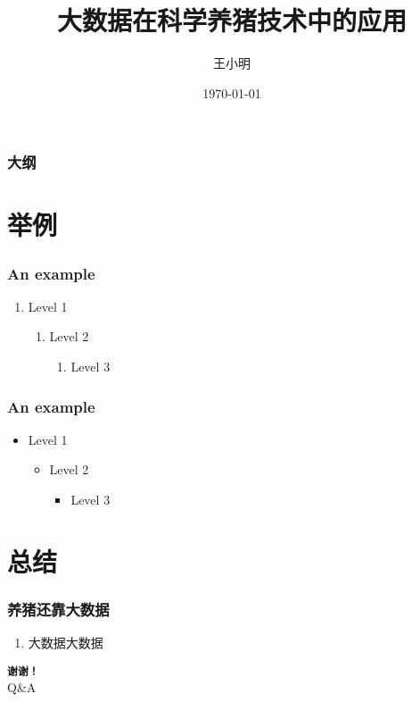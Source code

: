 \documentclass[xcolor=dvipsnames]{beamer}
\title{大数据在科学养猪技术中的应用}
\author{王小明}
\institute[CS@NJU]{南京大学计算机科学与技术系}
\date{\today}
\begin{document}
\begin{frame}
  \maketitle
\end{frame}

\begin{frame}
  \frametitle{大纲}
  \tableofcontents
\end{frame}

\section{举例}

\begin{frame}
  \frametitle{An example}
  \begin{enumerate}
    \item Level 1
      \begin{enumerate}
        \item Level 2
          \begin{enumerate}
            \item Level 3
          \end{enumerate}
      \end{enumerate}
  \end{enumerate}
\end{frame}

\begin{frame}
  \frametitle{An example\insertcontinuationtext}
  \begin{itemize}
    \item Level 1
      \begin{itemize}
        \item Level 2
          \begin{itemize}
            \item Level 3
          \end{itemize}
      \end{itemize}
  \end{itemize}
\end{frame}


\section{总结}

\begin{frame}
  \frametitle{养猪还靠大数据}


  \begin{enumerate}
    \item 大数据大数据
  \end{enumerate}

\end{frame}

\begin{frame}[c, plain]
  \begin{center}
    \Huge{\texttt{\textbf{谢谢！}}}\\[0.5cm]
    Q\&A
  \end{center}
\end{frame}
\end{document}

